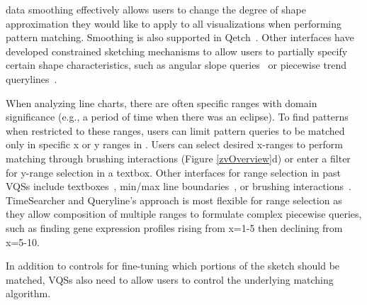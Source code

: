 data smoothing effectively allows users to 
change the degree of shape approximation 
they would like to apply to all visualizations 
when performing pattern matching. 
Smoothing is also supported in Qetch~\cite{Mannino2018}. 
Other interfaces have developed constrained 
sketching mechanisms to allow users to 
partially specify certain shape characteristics, 
such as angular slope queries~\cite{Hochheiser2004} or 
piecewise trend querylines~\cite{ryall2005querylines}. 

\par When analyzing line charts,
there are often specific ranges with
domain significance (e.g., a period of time when there was an eclipse). 
To find patterns when restricted to these ranges, 
users can limit pattern queries 
to be matched only in specific x or y ranges in \zvpp. Users can select desired x-ranges 
to perform matching through brushing interactions 
(Figure \ref{zvOverview}d) 
or enter a filter for y-range selection in a textbox. 
Other interfaces for range selection in past VQSs 
include textboxes~\cite{wattenberg2001sketching,Mannino2018}, 
min/max line boundaries~\cite{ryall2005querylines}, 
or brushing interactions~\cite{Hochheiser2001}. 
TimeSearcher and Queryline's approach is 
most flexible for range selection as 
they allow composition of multiple ranges 
to formulate complex piecewise queries, 
such as finding gene expression profiles 
rising from x=1-5 then declining from x=5-10. 
\par In addition to controls for fine-tuning
which portions of the sketch should be matched,
VQSs also need to allow users
to control the underlying matching algorithm. 

